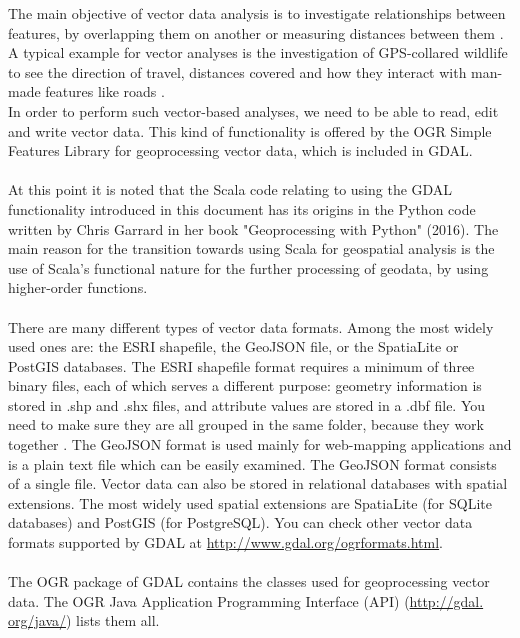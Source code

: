 \documentclass {article}
\begin{document}
The main objective of vector data analysis is to investigate relationships between features, by overlapping them on another or measuring distances between them \cite{garrard_geoprocessing_2016}. 
A typical example for vector analyses is the investigation of GPS-collared wildlife to see the direction of travel, distances covered and how they interact with man-made features like roads \cite{garrard_geoprocessing_2016}. \\
In order to perform such vector-based analyses, we need to be able to read, edit and write vector data. This kind of functionality is offered by the OGR Simple Features Library for geoprocessing vector data, which is included in GDAL. \\
\\
At this point it is noted that the Scala code relating to using the GDAL functionality introduced in this document has its origins in the Python code written by Chris Garrard in her book "Geoprocessing with Python" (2016). The main reason for the transition towards using Scala for geospatial analysis is the use of Scala's functional nature for the further processing of geodata, by using higher-order functions. \\
\\
There are many different types of vector data formats. Among the most widely used ones are: the ESRI shapefile, the GeoJSON file, or the SpatiaLite or PostGIS databases. 
The ESRI shapefile format requires a minimum of three binary files, each of which serves a different purpose: geometry information is stored in .shp and .shx files, and attribute values are stored in a .dbf file. You need to make sure they are all grouped in the same folder, because they work together \cite{garrard_geoprocessing_2016}. The GeoJSON format is used mainly for web-mapping applications and is a plain text file which can be easily examined. The GeoJSON format consists of a single file. Vector data can also be stored in relational databases with spatial extensions. The most widely used spatial extensions are SpatiaLite (for SQLite databases) and PostGIS (for PostgreSQL). 
You can check other vector data formats supported by GDAL at \href{http://www.gdal.org/ogr_formats.html}{http://www.gdal.org/ogr\underline{\space}formats.html}. \\ 
\\
The OGR package of GDAL contains the classes used for geoprocessing vector data. The OGR Java Application Programming Interface (API) \cite{noauthor_gdal_nodate} (\href{http://gdal.org/java/}{http://gdal.\\org/java/}) lists them all.
\end{document}
